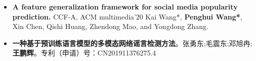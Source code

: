 \documentclass[zh]{resume}
\begin{document}
\begin{itemize}
  \item \textbf{A feature generalization framework for social media popularity prediction.} CCF-A, ACM multimedia'20
  Kai Wang*, \textbf{Penghui Wang*}, Xin Chen, Qishi Huang, Zhendong Mao, and Yongdong Zhang.
  \item \textbf{一种基于预训练语言模型的多模态网络谣言检测方法}。张勇东;毛震东;邓旭冉;\textbf{王鹏辉}。专利（申请）号：CN201911376275.4

\end{itemize}


\end{document}
